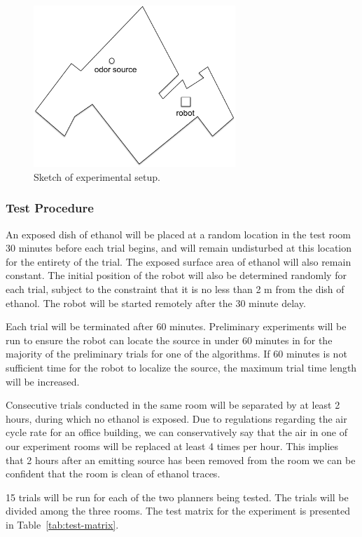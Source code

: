 \documentclass[submit]{aiaa-pretty-modified}
\begin{document}
\begin{figure}
\begin{center}
\includegraphics[width=3in]{img/layout.pdf}
\caption{Sketch of experimental setup.}
\label{fig:layout}
\end{center}
\end{figure}


\subsubsection{Test Procedure}

An exposed dish of ethanol will be placed at a random location in the test room
30 minutes before each trial begins, and will remain undisturbed at this
location for the entirety of the trial. The exposed surface area of ethanol will
also remain constant. The initial position of the robot will also be determined
randomly for each trial, subject to the constraint that it is no less than 2 m
from the dish of ethanol.  The robot will be started remotely after the 30
minute delay.

Each trial will be terminated after 60 minutes. Preliminary experiments will be
run to ensure the robot can locate the source in under 60 minutes in for the
majority of the preliminary trials for one of the algorithms. If 60 minutes is
not sufficient time for the robot to localize the source, the maximum trial time
length will be increased.

Consecutive trials conducted in the same room will be separated by at least 2
hours, during which no ethanol is exposed. Due to regulations regarding the air
cycle rate for an office building, we can conservatively say that the air in one
of our experiment rooms will be replaced at least 4 times per hour. This implies
that 2 hours after an emitting source has been removed from the room we can be
confident that the room is clean of ethanol traces.

15 trials will be run for each of the two planners being tested. The trials will
be divided among the three rooms. The test matrix for the experiment is
presented in Table~\ref{tab:test-matrix}. 
\end{document}
